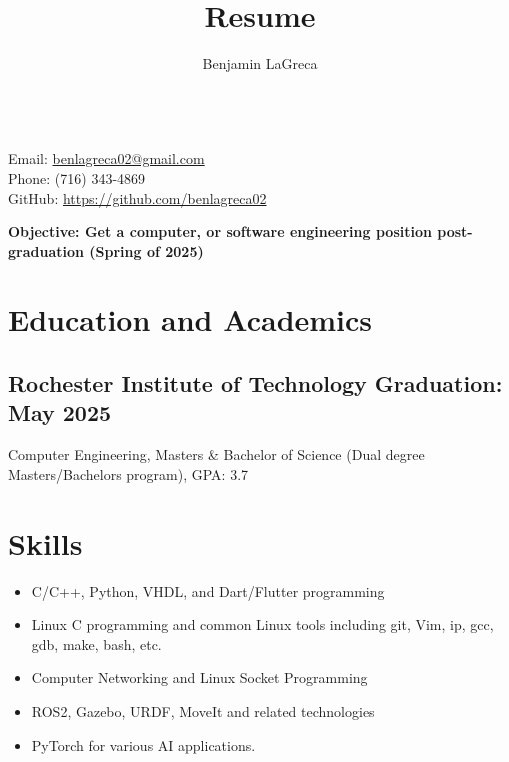 \documentclass{article}
\title{Resume}
\author{Benjamin LaGreca}
\begin{document}
\begin{center}
    {\Huge\bfseries\underline{\theauthor}} \\
    \vspace{.75em}
    Email: \url{benlagreca02@gmail.com} \\
    Phone: (716) 343-4869 \\
    GitHub: \url{https://github.com/benlagreca02}
    \vspace{.25em}
    
    \bfseries Objective: Get a computer, or software engineering position
    post-graduation (Spring of 2025)
\end{center}

\vspace{-1em}

\section{Education and Academics}

    \subsection{Rochester Institute of Technology \hfill Graduation: May 2025}
    Computer Engineering, Masters \& Bachelor of Science (Dual degree Masters/Bachelors 
    program), GPA: 3.7

\section {Skills}
    \begin{itemize}[noitemsep]
        \item
            C/C++, Python, VHDL, and Dart/Flutter programming
        \item
            Linux C programming and common Linux tools including git, Vim, ip, gcc, gdb, make,
            bash, etc.
        \item
            Computer Networking and Linux Socket Programming
        \item
            ROS2, Gazebo, URDF, MoveIt and related technologies
        \item
            PyTorch for various AI applications.


    \end{itemize}
\end{document}
